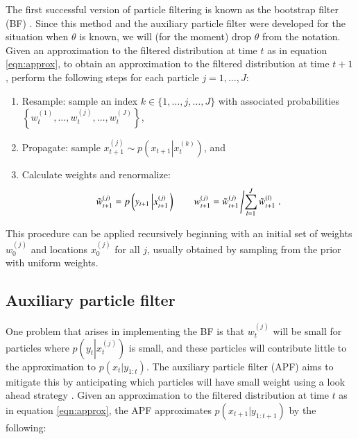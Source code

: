 \documentclass{elsarticle}
\begin{document}
The first successful version of particle filtering is known as the bootstrap filter (BF) \citep{Gord:Salm:Smit:nove:1993,Kita:mont:1996}. Since this method and the auxiliary particle filter were developed for the situation when $\theta$ is known, we will (for the moment) drop $\theta$ from the notation. Given an approximation to the filtered distribution at time $t$ as in equation \eqref{eqn:approx}, to obtain an approximation to the filtered distribution at time $t+1$, perform the following steps for each particle $j=1,\ldots,J$:

\begin{enumerate}
\item Resample: sample an index $k\in\{1,\ldots,j,\ldots,J\}$ with associated probabilities $\left\{w_t^{(1)},\ldots,w_t^{(j)},\ldots,w_t^{(J)}\right\}$,
\item Propagate: sample $x_{t+1}^{(j)} \sim p\left( x_{t+1}\left|x_t^{(k)}\right.\right)$, and
\item Calculate weights and renormalize:
\[ \tilde{w}_{t+1}^{(j)} = p\left(y_{t+1}\left|x_{t+1}^{(j)}\right.\right) \qquad w_{t+1}^{(j)} = \tilde{w}_{t+1}^{(j)}\left/ \sum_{l=1}^J \tilde{w}_{t+1}^{(l)} \right. .\]
\end{enumerate}

\noindent This procedure can be applied recursively beginning with an initial set of weights $w_0^{(j)}$ and locations $x_0^{(j)}$ for all $j$, usually obtained by sampling from the prior with uniform weights.

\subsection{Auxiliary particle filter \label{sec:apf}}

One problem that arises in implementing the BF is that $w_t^{(j)}$ will be small for particles where $p\left(y_{t}\left|x_{t}^{(j)}\right.\right)$ is small, and these particles will contribute little to the approximation to $p(x_{t}|y_{1:t})$. The auxiliary particle filter (APF) aims to mitigate this by anticipating which particles will have small weight using a look ahead strategy \citep{Pitt:Shep:filt:1999}. Given an approximation to the filtered distribution at time $t$ as in equation \eqref{eqn:approx}, the APF approximates $p(x_{t+1}|y_{1:t+1})$ by the following:
\end{document}
